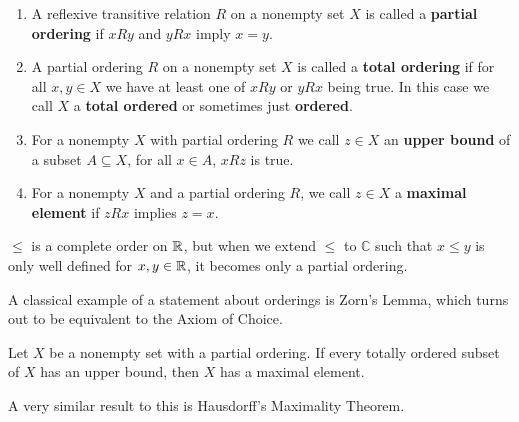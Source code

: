 \begin{definition}
\begin{enumerate}
	\item A reflexive transitive relation \(R\) on a nonempty set \(X\) is called a \textbf{partial ordering} if \(xRy\) and \(yRx\) imply \(x=y\).
	\item A partial ordering \(R\) on a nonempty set \(X\) is called a \textbf{total ordering} if for all \(x,y \in X\) we have  at least one of \(xRy\) or \(yRx\) being true. In this case we call \(X\) a \textbf{total ordered} or sometimes just \textbf{ordered}.
	\item For a nonempty \(X\) with partial ordering \(R\) we call \(z \in X\) an \textbf{upper bound} of a subset \(A \subseteq X\), for all \(x \in A\), \(xRz\) is true.
	\item For a nonempty \(X\) and a partial ordering \(R\), we call \(z \in X\) a \textbf{maximal element} if \(zRx\) implies \(z = x\).
\end{enumerate}
\end{definition}
\begin{example}
	\(\le\) is a complete order on \(\mathbb{R}\), but when we extend \(\le\) to \(\mathbb{C}\) such that \(x\le y\) is only well defined for \(x, y \in \mathbb{R}\), it becomes only a partial ordering.
\end{example}
A classical example of a statement about orderings is Zorn's Lemma, which turns out to be equivalent to the Axiom of Choice.
\begin{theorem}
	Let \(X\) be a nonempty set with a partial ordering. If every totally ordered subset of \(X\) has an upper bound, then \(X\) has a maximal element.
\end{theorem}
A very similar result to this is Hausdorff's Maximality Theorem.
